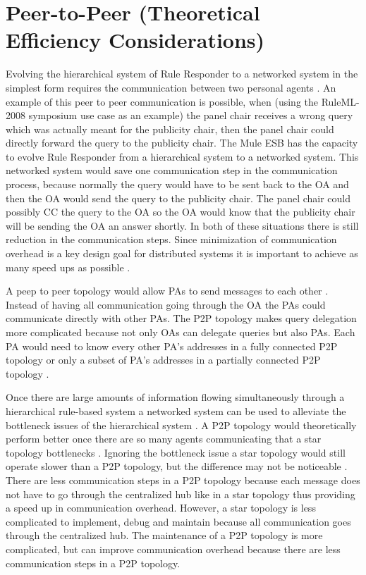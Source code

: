 \documentclass[12pt]{report}
\begin{document}
\section{Peer-to-Peer (Theoretical Efficiency Considerations)}
Evolving the hierarchical system of Rule Responder to a networked system in the simplest form requires the communication between two personal agents \cite{CraigBoley08}.  An example of this peer to peer communication is possible, when (using the RuleML-2008 symposium use case as an example) the panel chair receives a wrong query which was actually meant for the publicity chair, then the panel chair could directly forward the query to the publicity chair.  The Mule ESB has the capacity to evolve Rule Responder from a hierarchical system to a networked system.  This networked system would save one communication step in the communication process, because normally the query would have to be sent back to the OA and then the OA would send the query to the publicity chair.  The panel chair could possibly CC the query to the OA so the OA would know that the publicity chair will be sending the OA an answer shortly.  In both of these situations there is still reduction in the communication steps.  Since minimization of communication overhead is a key design goal for distributed systems it is important to achieve as many speed ups as possible \cite{googleDS}.

A peep to peer topology would allow PAs to send messages to each other \cite{CraigBoley08}.  Instead of having all communication going through the OA the PAs could communicate directly with other PAs.  The P2P topology makes query delegation more complicated because not only OAs can delegate queries but also PAs.  Each PA would need to know every other PA's addresses in a fully connected P2P topology or only a subset of PA's addresses in a partially connected P2P topology \cite{Topology}. 

Once there are large amounts of information flowing simultaneously through a hierarchical rule-based system a networked system can be used to alleviate the bottleneck issues of the hierarchical system \cite{Topology}.  A P2P topology would theoretically perform better once there are so many agents communicating that a star topology bottlenecks \cite{P2P}.  Ignoring the bottleneck issue a star topology would still operate slower than a P2P topology, but the difference may not be noticeable \cite{Topology}.  There are less communication steps in a P2P topology because each message does not have to go through the centralized hub like in a star topology thus providing a speed up in communication overhead.  However, a star topology is less complicated to implement, debug and maintain because all communication goes through the centralized hub.  The maintenance of a P2P topology is more complicated, but can improve communication overhead because there are less communication steps in a P2P topology.
\end{document}

